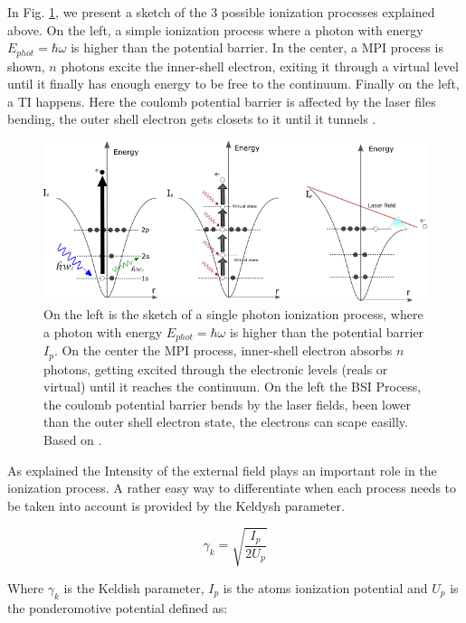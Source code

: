 In Fig. \ref{img:ionizationprocess}, we present a sketch of the 3 possible ionization processes explained above. On the left, a simple ionization process where a photon with energy $E_{phot} = \hbar\omega$ is higher than the potential barrier. In the center, a MPI process is shown, $n$ photons excite the inner-shell electron, exiting it through a virtual level until it finally has enough energy to be free to the continuum. Finally on the left, a TI happens. Here the coulomb potential barrier is affected by the laser files bending, the outer shell electron gets closets to it until it tunnels \cite{rafipoor_two-color_2017}.

\begin{figure}[h!]

\centering
\includegraphics[width = 14 cm]{../Images/photoionization2.png}
\caption[Ionization regimes]{ On the left is the sketch of a single photon ionization process, where a photon with energy $E_{phot} = \hbar\omega$ is higher than the potential barrier $I_{p}$. On the center the MPI process, inner-shell electron absorbs $n$ photons, getting excited through the electronic levels (reals or virtual) until it reaches the continuum. On the left the BSI Process, the coulomb potential barrier bends by the laser fields, been lower than the outer shell electron state, the electrons can scape easilly. Based on \cite{rafipoor_two-color_2017}.}
\label{img:ionizationprocess}
\end{figure}


As explained the Intensity of the external field plays an important role in the ionization process. A rather easy way to differentiate when each process needs to be taken into account is provided by the Keldysh parameter\cite{keldysh_ionization_1965}.

\begin{equation}
\gamma_{k}=\sqrt{\dfrac{I_{p}}{2U_{p}}}
\end{equation}

Where $\gamma_{k}$ is the Keldish parameter, $I_{p}$ is the atoms ionization potential and $U_{p}$ is the ponderomotive potential defined as:

